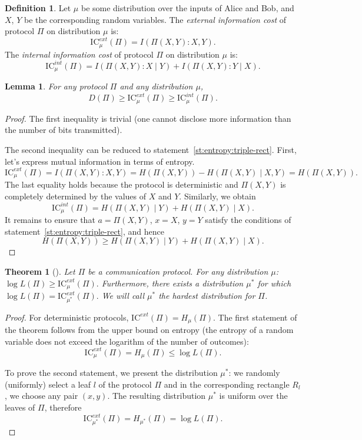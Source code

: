 \documentclass[12pt,sans]{article}
\newcommand{\IC}{\mathrm{IC}}
\theoremstyle{definition}
\newtheorem{definition}{Definition}[section]
\theoremstyle{plain}
\newtheorem{theorem}{Theorem}[section]
\newtheorem{lemma}{Lemma}[section]
\theoremstyle{remark}
\begin{document}
\begin{definition}
    Let $\mu$ be some distribution over the inputs of Alice and Bob,
    and $X$, $Y$ be the corresponding random variables.
    The \emph{external information cost} of protocol $\Pi$ on distribution $\mu$ is:
    $$\IC_\mu^{ext}(\Pi) = I(\Pi(X,Y) : X, Y).$$
    The \emph{internal information cost} of protocol $\Pi$ on distribution $\mu$ is:
    $$\IC_\mu^{int}(\Pi) = I(\Pi(X,Y) : X \mid Y) + I(\Pi(X,Y) : Y \mid X).$$
\end{definition}

\begin{lemma}
    For any protocol $\Pi$ and any distribution $\mu$,
    \[
    D(\Pi) \ge \IC_\mu^{ext}(\Pi) \ge \IC_\mu^{int}(\Pi).
    \]
\end{lemma}
\begin{proof}
    The first inequality is trivial (one cannot disclose more information than the number of bits transmitted).

    The second inequality can be reduced to statement~\ref{st:entropy:triple-rect}. First, let's express mutual information in terms of entropy.
    \[
    \IC_\mu^{ext}(\Pi) = I(\Pi(X,Y) : X, Y) = H(\Pi(X,Y)) - H(\Pi(X,Y) \mid X, Y) = H(\Pi(X,Y)).
    \]
    The last equality holds because the protocol is deterministic and $\Pi(X,Y)$ is completely determined by the values of $X$ and $Y$.
    Similarly, we obtain
    \[
    \IC_\mu^{int}(\Pi) = H(\Pi(X,Y) \mid Y) + H(\Pi(X,Y) \mid X).
    \]
    It remains to ensure that $a = \Pi(X,Y)$, $x = X$, $y = Y$ satisfy the conditions of statement~\ref{st:entropy:triple-rect},
    and hence
    \[
    H(\Pi(X,Y)) \ge H(\Pi(X,Y) \mid Y) + H(\Pi(X,Y) \mid X).
    \]
\end{proof}

\begin{theorem}[\cite{DMWW12}]
    Let $\Pi$ be a communication protocol. For any distribution $\mu$:
    \(
    \log L(\Pi) \ge \IC_\mu^{ext}(\Pi).
    \)
    Furthermore, there exists a distribution $\mu^*$ for which
    \(
    \log L(\Pi) = \IC_{\mu^*}^{ext}(\Pi).
    \)
    We will call $\mu^*$ the \emph{hardest} distribution for $\Pi$.
\end{theorem}
\begin{proof} For deterministic protocols, $\IC^{ext}(\Pi) = H_\mu(\Pi)$.
    The first statement of the theorem follows from the upper bound on entropy (the entropy
    of a random variable does not exceed the logarithm of the number of outcomes):
    \[
    \IC_\mu^{ext}(\Pi) = H_\mu(\Pi) \le \log L(\Pi).
    \]

    To prove the second statement, we present the distribution $\mu^*$:
    we randomly (uniformly) select a leaf $l$ of the protocol $\Pi$ and in the corresponding rectangle $R_l$, we choose any pair $(x,y)$. The resulting distribution $\mu^*$ is uniform over the leaves of $\Pi$, therefore
    \[
    \IC_{\mu^*}^{ext}(\Pi) = H_{\mu^*}(\Pi) = \log L(\Pi).
    \]
\end{proof}
\end{document}
